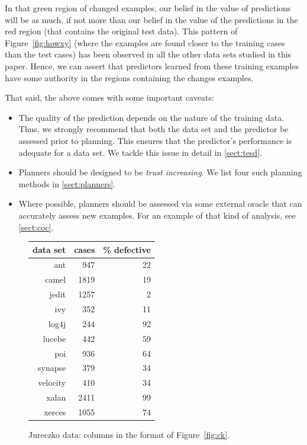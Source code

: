 \documentclass{sig-alternate}
\newcommand{\bi}{\begin{itemize}}
\newcommand{\ei}{\end{itemize}}
\newcommand{\tion}[1]{\textsection\ref{sect:#1}}
\newcommand{\fig}[1]{Figure~\ref{fig:#1}}
\begin{document}
In that green region of changed examples, our belief in the value of predictions
will be as much, if not more than our belief in the value of the predictions in the red region (that
contains the original test data).
This pattern of \fig{howxy} (where the examples are found closer to  the training cases than the test cases) has been observed in all the other data sets studied in this
paper. Hence,  we can assert that
predictors learned from these training examples have some authority in the regions
containing the changes examples.


That said, the above comes with some important caveats:
\bi
\item 
The quality of the prediction depends on the nature of the training data. Thus, we strongly recommend that both the data set and the predictor be assessed prior to planning. This ensures that the predictor's performance is adequate for a data set. We tackle this issue in detail in \tion{tesd}.
\item
Planners should be designed to be {\em trust increasing}. We list four such planning methods in \tion{planners}.
\item
Where possible, planners should be assessed via some external
oracle that can accurately assess new examples. For an example of that kind of analysis,
see  \tion{coc}.
\ei



  
 \begin{figure}[!t]
 \small
 \begin{center}
 \begin{tabular}{r|rr}
 data set & cases & \% defective\\\hline
  ant &947& 22\\
  camel& 1819& 19\\
 jedit& 1257& 2\\
 ivy &352& 11\\
 log4j& 244 &92\\
 lucebe &442 &59\\
 poi& 936 &64\\
 synapse &379 &34\\
 velocity& 410& 34\\
 xalan& 2411& 99\\
 xerces &1055& 74
 \end{tabular}
 \end{center}
 \caption{ Jureczko data: columns in the format of \fig{ck}.}\label{fig:jd}
 \end{figure}
 
\end{document}

